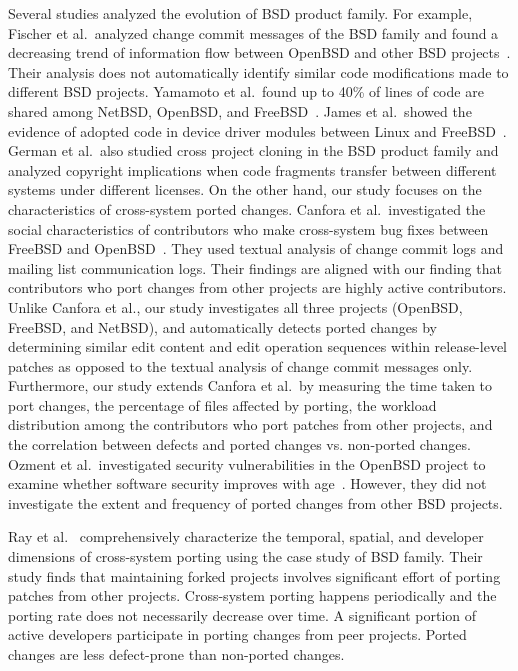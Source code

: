 \documentclass[runningheads,a4paper]{llncs}
\begin{document}
Several studies analyzed the evolution of BSD product family. For example, Fischer et al.~analyzed change commit messages of the BSD family and found a decreasing trend of information flow between OpenBSD and other BSD projects~\cite{Fischer2005}. Their analysis does not automatically identify similar code modifications made to different BSD projects. Yamamoto et al.~found up to 40\% of lines of code are shared among NetBSD, OpenBSD, and FreeBSD~\cite{Yamamoto2005:bsdclone}. James et al.~showed the evidence of adopted code in device driver modules between Linux and FreeBSD~\cite{Cordy2011:largecloning}. 
German et al.~also studied cross project cloning in the BSD product family and analyzed copyright implications when code fragments transfer between different systems under different licenses. On the other hand, our study focuses on the characteristics of cross-system ported changes. 
Canfora et al.~investigated the social characteristics of contributors who make cross-system bug fixes between FreeBSD and OpenBSD~\cite{Canfora2011:bsdfork}. They used textual analysis of change commit logs and mailing list communication logs. Their findings are aligned with our finding that contributors who port changes from other projects are highly active contributors.  Unlike Canfora et al., our study investigates all three projects (OpenBSD,  FreeBSD, and NetBSD), and automatically detects ported changes by determining similar edit content and edit operation sequences within release-level patches as opposed to the textual analysis of change commit messages only. Furthermore, our study extends Canfora et al.~by measuring the time taken to port changes, the percentage of files affected by porting, the workload distribution among the contributors who port patches from other projects, and the correlation between defects and ported changes vs. non-ported changes. Ozment et al.~investigated security vulnerabilities in the OpenBSD project to examine whether software security improves with age~\cite{Ozment2006}. However, they did not investigate the extent and frequency of ported changes from other BSD projects. 

Ray et al.~\cite{Ray2012:porting} comprehensively characterize the temporal, spatial, and developer dimensions of cross-system porting using the case study of BSD family. Their study finds that maintaining forked projects involves significant effort of porting patches from other projects. Cross-system porting happens periodically and the porting rate does not necessarily decrease over time. A significant portion of active developers participate in porting changes from peer projects. Ported changes are less defect-prone than non-ported changes. 
\end{document}
